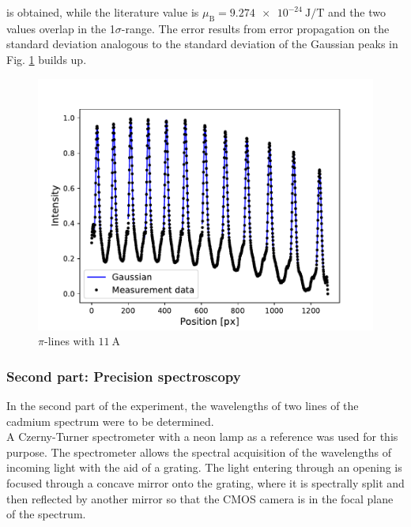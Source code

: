 is obtained, while the literature value is $\mu_\text{B}=\SI{9.274e-24}{\joule\per\tesla}$ and the two values overlap in the 1$\sigma$-range.
The error results from error propagation on the standard deviation analogous to the standard deviation of the Gaussian peaks in Fig. \ref{fig:gaussian} builds up.
\begin{figure}[ht]
\centering
\includegraphics[scale=.55]{images//gaussian.pdf}
\caption{$\pi$-lines with $\SI{11}{\ampere}$}
\label{fig:gaussian}
\end{figure}


\subsubsection{Second part: Precision spectroscopy}
In the second part of the experiment, the wavelengths of two lines of the cadmium spectrum were to be determined.\\

A Czerny-Turner spectrometer with a neon lamp as a reference was used for this purpose.
The spectrometer allows the spectral acquisition of the wavelengths of incoming light with the aid of a grating.
The light entering through an opening is focused through a concave mirror onto the grating, where it is spectrally split and then reflected by another mirror so that the CMOS camera is in the focal plane of the spectrum.\\

